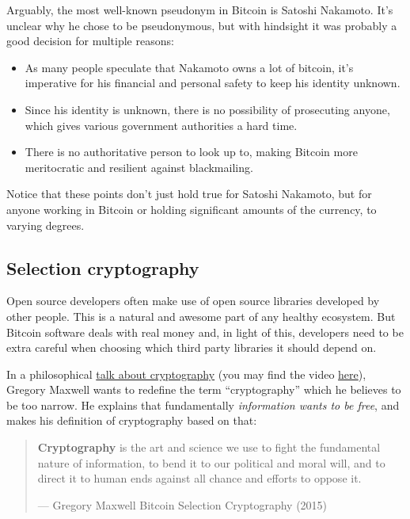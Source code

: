 Arguably, the most well-known pseudonym in Bitcoin is Satoshi Nakamoto.
It's unclear why he chose to be pseudonymous, but with hindsight it was
probably a good decision for multiple reasons:

\begin{itemize}
\item
  As many people speculate that Nakamoto owns a lot of bitcoin, it's
  imperative for his financial and personal safety to keep his identity
  unknown.
\item
  Since his identity is unknown, there is no possibility of prosecuting
  anyone, which gives various government authorities a hard time.
\item
  There is no authoritative person to look up to, making Bitcoin more
  meritocratic and resilient against blackmailing.
\end{itemize}

Notice that these points don't just hold true for Satoshi Nakamoto, but
for anyone working in Bitcoin or holding significant amounts of the
currency, to varying degrees.

\hypertarget{selectioncryptography}{%
\subsection{Selection cryptography}\label{selectioncryptography}}

Open source developers often make use of open source libraries developed
by other people. This is a natural and awesome part of any healthy
ecosystem. But Bitcoin software deals with real money and, in light of
this, developers need to be extra careful when choosing which third
party libraries it should depend on.

In a philosophical
\href{https://btctranscripts.com/greg-maxwell/2015-04-29-gmaxwell-bitcoin-selection-cryptography/}{talk
about cryptography} (you may find the video
\href{https://youtu.be/Gs9lJTRZCDc?t=2236}{here}), Gregory Maxwell wants
to redefine the term ``cryptography'' which he believes to be too
narrow. He explains that fundamentally \emph{information wants to be
free}, and makes his definition of cryptography based on that:

\begin{quote}
\textbf{Cryptography} is the art and science we use to fight the
fundamental nature of information, to bend it to our political and moral
will, and to direct it to human ends against all chance and efforts to
oppose it.

---  Gregory Maxwell Bitcoin Selection Cryptography (2015)
\end{quote}

